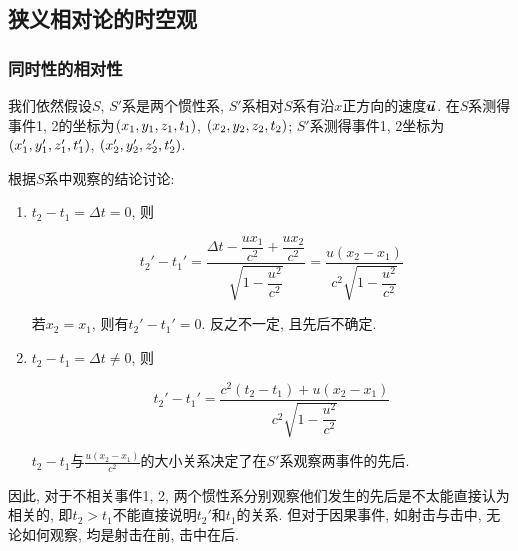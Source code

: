 \subsection{狭义相对论的时空观}

\subsubsection{同时性的相对性}

我们依然假设$S$, $S'$系是两个惯性系, $S'$系相对$S$系有沿$x$正方向的速度$\va*{u}$. 在$S$系测得事件1, 2的坐标为$\qty(x_1, y_1, z_1, t_1)$, $\qty(x_2, y_2, z_2, t_2)$; $S'$系测得事件1, 2坐标为$\qty(x_1', y_1', z_1', t_1')$, $\qty(x_2', y_2', z_2', t_2')$.

根据$S$系中观察的结论讨论: 

\begin{enumerate}
	
	\item $t_2 - t_1 = \Delta t = 0$, 则
	
	\begin{equation}
		t_2' - t_1' = \dfrac{\Delta t - \dfrac{u x_1}{c^2} + \dfrac{u x_2}{c^2}}{\sqrt{1 - \dfrac{u^2}{c^2}}} = \dfrac{u(x_2 - x_1)}{c^2\sqrt{1 - \dfrac{u^2}{c^2}}}
		\label{C6-eq16}
	\end{equation}
	
	若$x_2 = x_1$, 则有$t_2' - t_1' = 0$. 反之不一定, 且先后不确定. 
	
	\item $t_2 - t_1 = \Delta t \neq 0$, 则
	
	\begin{equation}
		t_2' - t_1' = \dfrac{c^2(t_2 - t_1) + u(x_2 - x_1)}{c^2\sqrt{1 - \dfrac{u^2}{c^2}}} 
		\label{C6-eq17}
	\end{equation}
	
	$t_2 - t_1$与$\frac{u(x_2 - x_1)}{c^2}$的大小关系决定了在$S'$系观察两事件的先后.
	
\end{enumerate}

因此, 对于不相关事件1, 2, 两个惯性系分别观察他们发生的先后是不太能直接认为相关的, 即$t_2 > t_1$不能直接说明$t_2'$和$t_1$的关系. 但对于因果事件, 如射击与击中, 无论如何观察, 均是射击在前, 击中在后.

